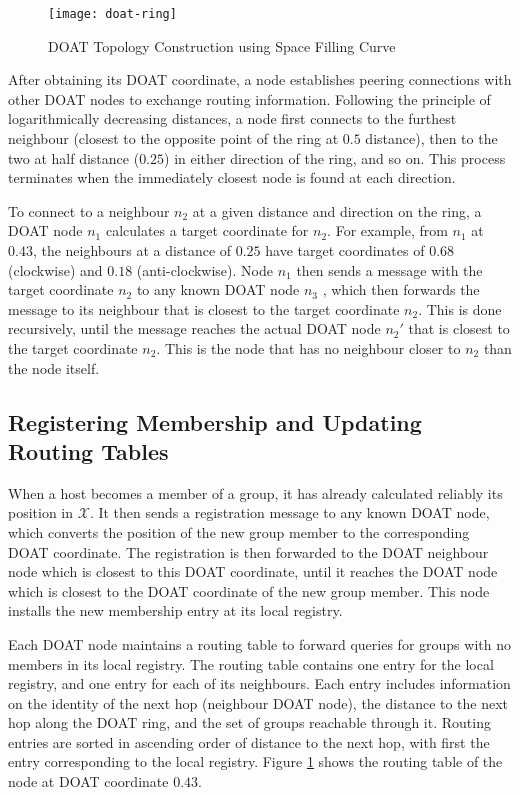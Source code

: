 \begin{figure}[h]
\begin{center}
\texttt{[image: doat-ring]}
\caption{DOAT Topology Construction using Space Filling Curve}
\label{fig:doat}
\end{center}
\end{figure}


After obtaining its DOAT coordinate, a node establishes peering connections
with other DOAT nodes to exchange routing information. 
Following the principle of logarithmically decreasing
distances, a node first connects to the furthest neighbour (closest to the
opposite point of the ring at $0.5$ distance), then to the two at half
distance ($0.25$) in either direction of the ring, and so on.
This process terminates 
when the immediately closest node is found at each direction. 

To connect to a neighbour $n_2$ at a given distance and direction on the ring, 
a DOAT node $n_1$ calculates a target coordinate for $n_2$. For example,
from $n_1$ at $0.43$, the neighbours at a distance of $0.25$ have target
coordinates of $0.68$ (clockwise) and $0.18$ (anti-clockwise).  
Node $n_1$ then sends a message with the target coordinate $n_2$ to any known
DOAT node $n_3$
, which then forwards the message to its
neighbour that is closest to the target coordinate $n_2$.
This is done recursively, until the message reaches the actual DOAT node
$n_2'$ that is closest to the target coordinate $n_2$. This is the node that
has no neighbour closer to $n_2$ than the node itself.



\subsection{Registering Membership and Updating Routing Tables}
\label{subsect:registering}

When a host becomes a member of a group, it has already
calculated reliably its position in $\mathcal{X}$. It then
sends a registration message to any known DOAT node, which converts the
position of the new group member to the corresponding DOAT coordinate. 
The registration is then forwarded to the DOAT neighbour node 
which is closest to this DOAT coordinate,
until it reaches the DOAT node which is closest to the DOAT coordinate of
the new group member. This node installs the new membership entry at its
local registry.

Each DOAT node maintains a routing table to forward queries for groups
with no members in its local registry. The routing table contains one entry for
the local registry, and one entry for each of its
neighbours. Each entry includes
information on the identity of the next hop (neighbour DOAT node), the
distance to the next hop along the DOAT ring, and the set of groups
reachable through it. Routing entries are sorted in ascending
order of distance to the next hop, with first the entry corresponding
to the local registry. 
Figure \ref{fig:doat} shows the routing table of
the node at DOAT coordinate $0.43$.

